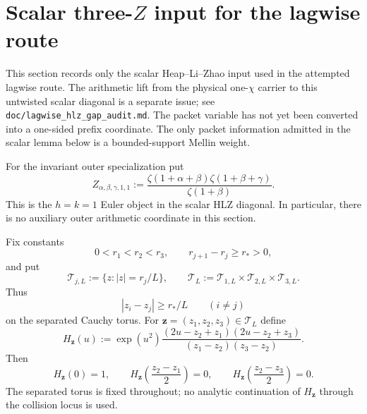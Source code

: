 \section{Scalar three-\texorpdfstring{$Z$}{Z} input for the lagwise route}
\label{sec:scalar-hlz-core}

This section records only the scalar Heap--Li--Zhao input used in the attempted
lagwise route.  The arithmetic lift from the physical one-$\chi$ carrier to
this untwisted scalar diagonal is a separate issue; see
\texttt{doc/lagwise\_hlz\_gap\_audit.md}.  The packet variable has not yet been
converted into a one-sided prefix coordinate.  The only packet information
admitted in the scalar lemma below is a bounded-support Mellin weight.

For the invariant outer specialization put
\begin{equation}
\boxed{
Z_{\alpha,\beta,\gamma,1,1}
:=\frac{\zeta(1+\alpha+\beta)\zeta(1+\beta+\gamma)}
        {\zeta(1+\beta)}.
}
\label{eq:scalar-HLZ-Euler-object}
\end{equation}
This is the $h=k=1$ Euler object in the scalar HLZ diagonal.  In particular,
there is no auxiliary outer arithmetic coordinate in this section.

Fix constants
\[
0<r_1<r_2<r_3,\qquad r_{j+1}-r_j\ge r_*>0,
\]
and put
\[
\mathcal T_{j,L}:=\{z:|z|=r_j/L\},\qquad
\mathcal T_L:=\mathcal T_{1,L}\times\mathcal T_{2,L}\times\mathcal T_{3,L}.
\]
Thus
\[
|z_i-z_j|\ge r_*/L\qquad(i\ne j)
\]
on the separated Cauchy torus.  For $\mathbf z=(z_1,z_2,z_3)\in\mathcal T_L$
define
\begin{equation}
\boxed{
H_{\mathbf z}(u):=
\exp(u^2)
\frac{(2u-z_2+z_1)(2u-z_2+z_3)}
     {(z_1-z_2)(z_3-z_2)}.
}
\label{eq:scalar-HLZ-auxiliary}
\end{equation}
Then
\begin{equation}
H_{\mathbf z}(0)=1,
\qquad
H_{\mathbf z}\!\left(\frac{z_2-z_1}{2}\right)=0,
\qquad
H_{\mathbf z}\!\left(\frac{z_2-z_3}{2}\right)=0.
\label{eq:scalar-HLZ-auxiliary-zeros}
\end{equation}
The separated torus is fixed throughout; no analytic continuation of
$H_{\mathbf z}$ through the collision locus is used.

